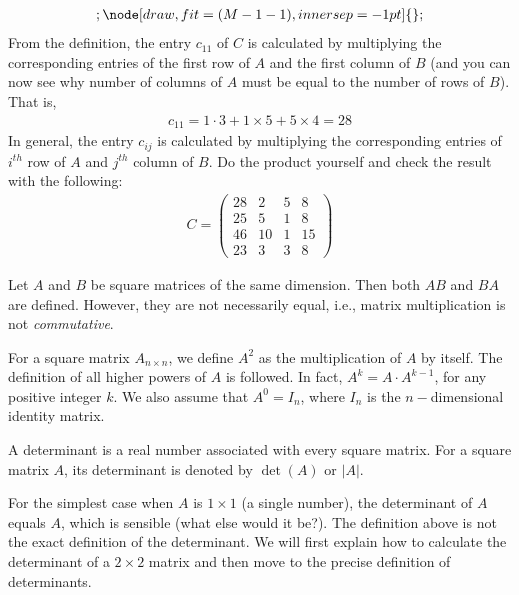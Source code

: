 \documentclass{subfile}
\begin{document}
\begin{example}
\begin{align*}
{{{							};
							\node[draw,fit=(M-1-1),inner sep=-1pt] {};
					}}
				\end{align*}
			From the definition, the entry $c_{11}$ of $C$ is calculated by multiplying the corresponding entries of the first row of $A$ and the first column of $B$ (and you can now see why number of columns of $A$ must be equal to the number of rows of $B$). That is,
				\begin{align*}
					c_{11}=1 \cdot 3 + 1 \times 5 + 5 \times 4 = 28
				\end{align*}
			In general, the entry $c_{ij}$ is calculated by multiplying the corresponding entries of $i^{th}$ row of $A$ and $j^{th}$ column of $B$. Do the product yourself and check the result with the following:
			\begin{align*}
			C = \begin{pmatrix}
				{28}&2&5&8\\
				{25}&5&1&8\\
				{46}&{10}&1&{15}\\
				{23}&3&3&8
				\end{pmatrix}
			\end{align*}
	\end{example}

	\begin{note}
		Let $A$ and $B$ be square matrices of the same dimension. Then both $AB$ and $BA$ are defined. However, they are not necessarily equal, i.e., matrix multiplication is not \textit{commutative}.
	\end{note}


	\begin{definition}
		For a square matrix $A_{n\times n}$, we define $A^2$ as the multiplication of $A$ by itself. The definition of all higher powers of $A$ is followed. In fact, $A^k=A \cdot A^{k-1}$, for any positive integer $k$. We also assume that $A^{0}=I_n$, where $I_n$ is the $n-$dimensional identity matrix.
	\end{definition}

	\begin{definition}
		A determinant is a real number associated with every square matrix. For a square matrix $A$, its determinant is denoted by $\det(A)$ or $|A|$.
	\end{definition}

For the simplest case when $A$ is $1\times 1$ (a single number), the determinant of $A$ equals $A$, which is sensible (what else would it be?). The definition above is not the exact definition of the determinant. We will first explain how to calculate the determinant of a $2\times 2$ matrix and then move to the precise definition of determinants.
\end{document}
